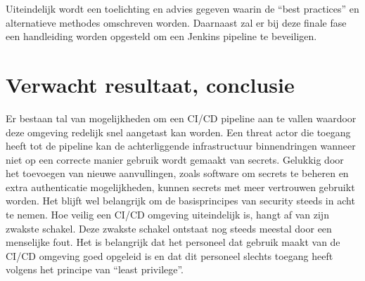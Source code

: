 Uiteindelijk wordt een toelichting en advies gegeven waarin de “best practices” en alternatieve methodes omschreven worden. Daarnaast zal er bij deze finale fase een handleiding worden opgesteld om een Jenkins pipeline te beveiligen.


\section{Verwacht resultaat, conclusie}%
\label{sec:verwachte_resultaten}

Er bestaan tal van mogelijkheden om een CI/CD pipeline aan te vallen waardoor deze omgeving redelijk snel aangetast kan worden. Een threat actor die toegang heeft tot de pipeline kan de achterliggende infrastructuur binnendringen wanneer niet op een correcte manier gebruik wordt gemaakt van secrets. Gelukkig door het toevoegen van nieuwe aanvullingen, zoals software om secrets te beheren en extra authenticatie mogelijkheden, kunnen secrets met meer vertrouwen gebruikt worden. Het blijft wel belangrijk om de basisprincipes van security steeds in acht te nemen. Hoe veilig een CI/CD omgeving uiteindelijk is, hangt af van zijn zwakste schakel. Deze zwakste schakel ontstaat nog steeds meestal door een menselijke fout. Het is belangrijk dat het personeel dat gebruik maakt van de CI/CD omgeving goed opgeleid is en dat dit personeel slechts toegang heeft volgens het principe van “least privilege”. 
